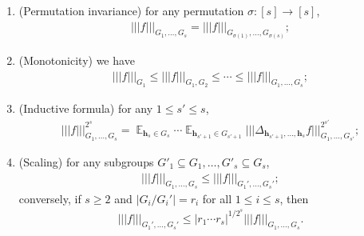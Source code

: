 \documentclass[11pt]{amsart}
\theoremstyle{definition}
\DeclareMathOperator*{\E}{\mathbb{E}}
\newcommand{\CC}{{\mathcal C}}
\newcommand{\bh}{{\mathbf{h}}}
\newcommand{\eps}{\epsilon}
\newcommand{\ueps}{{\underline{\epsilon}}}
\newcommand{\nnorm}[1]{\lvert\!|\!| #1|\!|\!\rvert}
\newcommand{\1}{{\mathbf{1}}}
\begin{document}
\begin{enumerate}
    \item (Permutation invariance) for
    any permutation $\sigma:[s]\to[s]$, 
    \begin{align*}
        \nnorm{f}_{G_1, \ldots, G_s} = \nnorm{f}_{G_{\sigma(1)},\ldots, G_{\sigma(s)}};
    \end{align*}
    \item (Monotonicity) we have
    \begin{align*}
    \nnorm{f}_{G_1}\leq \nnorm{f}_{G_1, G_2}\leq \cdots\leq    \nnorm{f}_{G_1, \ldots, G_s};
    \end{align*}
    \item (Inductive formula) for any $1\leq s'\leq s$, 
    \begin{align*}
        \nnorm{f}_{G_1, \ldots, G_s}^{2^s} = \E_{\bh_s\in G_s}\cdots \E_{\bh_{s'+1}\in G_{s'+1}}\nnorm{\Delta_{\bh_{s'+1}, \ldots, \bh_s}f}_{G_1, \ldots, G_{s'}}^{2^{s'}};
    \end{align*}
    \item \label{I:scaling} (Scaling) for any subgroups $G'_1\subseteq G_1, \ldots, G'_s\subseteq G_s$,
    \begin{align}\label{E: scaling 1}
        \nnorm{f}_{G_1, \ldots, G_s}\leq \nnorm{f}_{G_1', \ldots, G_s'};
    \end{align}
    conversely, if $s\geq 2$ and $|G_i/G_i'| = r_i$ for all $1\leq i\leq s$, then
    \begin{align}\label{E: scaling 2}
        \nnorm{f}_{G_1', \ldots, G_s'}\leq |r_1\cdots r_s|^{1/2^s}\nnorm{f}_{G_1, \ldots, G_s}.
    \end{align}
\end{enumerate}
\end{document}
